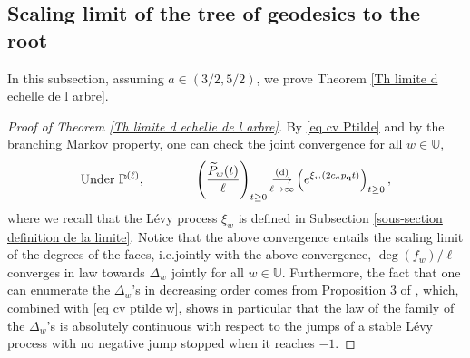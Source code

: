 \documentclass[11pt]{article}
\numberwithin{equation}{section}
\def \U{\mathbb{U}}
\def\P{\mathbb{P}}
\begin{document}
 
\subsection{Scaling limit of the tree of geodesics to the root}
In this subsection, assuming $a \in (3/2, 5/2)$, we prove Theorem \ref{Th limite d echelle de l arbre}. 

\begin{proof}[Proof of Theorem \ref{Th limite d echelle de l arbre}]By \eqref{eq cv Ptilde} and by the branching Markov property, one can check the joint convergence for all $w \in \U$,
\begin{equation}\label{eq cv ptilde w}
\text{Under }\P^{(\ell)}, \qquad \qquad \left(\frac{\widetilde{P}_w(t)}{\ell} \right)_{t\ge 0}
\mathop{\longrightarrow}\limits_{\ell \to \infty}^{(\mathrm{d})}
\left(e^{\xi_w(2c_a p_{\bf q} t)}\right)_{t\ge 0},
\end{equation}
{where we recall that the Lévy process $\xi_w$ is defined in Subsection \ref{sous-section definition de la limite}.}
Notice that the above convergence entails the scaling limit of the degrees of the faces, i.e.\@ jointly with the above convergence, $\deg( f_w)/ \ell $ converges in law towards $\Delta_w$ jointly for all $w \in \U$. Furthermore, the fact that one can enumerate the $\Delta_w$'s in decreasing order comes from Proposition 3 of \cite{CCM20}, which, combined with \eqref{eq cv ptilde w}, shows in particular that the law of the family of the $\Delta_w$'s is absolutely continuous with respect to the jumps of a stable Lévy process with no negative jump stopped when it reaches $-1$.




\end{proof}
\end{document}
